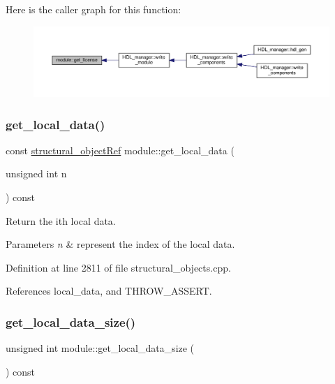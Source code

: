Here is the caller graph for this function\+:
\nopagebreak
\begin{figure}[H]
\begin{center}
\leavevmode
\includegraphics[width=350pt]{d0/dd3/classmodule_ab552447118d780e217d9f3e38a5711cc_icgraph}
\end{center}
\end{figure}
\mbox{\label{classmodule_a9c40c5d1b329a955c18f72d35ae2625e}} 
\subsubsection{\texorpdfstring{get\+\_\+local\+\_\+data()}{get\_local\_data()}}
{\footnotesize\ttfamily const \hyperlink{structural__objects_8hpp_a8ea5f8cc50ab8f4c31e2751074ff60b2}{structural\+\_\+object\+Ref} module\+::get\+\_\+local\+\_\+data (\begin{DoxyParamCaption}\item[{unsigned int}]{n }\end{DoxyParamCaption}) const}



Return the ith local data. 


\begin{DoxyParams}{Parameters}
{\em n} & represent the index of the local data. \\
\hline
\end{DoxyParams}


Definition at line 2811 of file structural\+\_\+objects.\+cpp.



References local\+\_\+data, and T\+H\+R\+O\+W\+\_\+\+A\+S\+S\+E\+RT.

\mbox{\label{classmodule_a07738280ce95e0a18d01510929d46a83}} 
\subsubsection{\texorpdfstring{get\+\_\+local\+\_\+data\+\_\+size()}{get\_local\_data\_size()}}
{\footnotesize\ttfamily unsigned int module\+::get\+\_\+local\+\_\+data\+\_\+size (\begin{DoxyParamCaption}{ }\end{DoxyParamCaption}) const}



